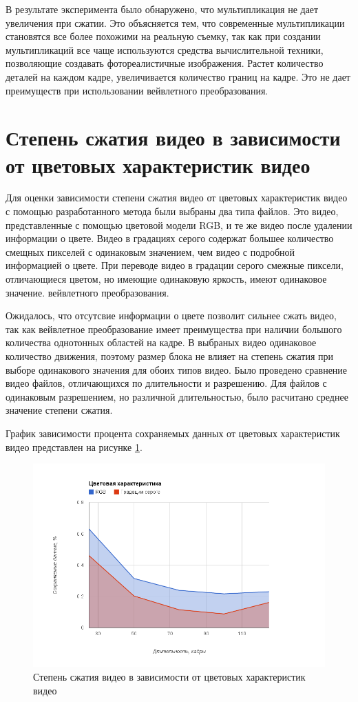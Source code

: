 В результате эксперимента было обнаружено, что мультипликация не дает увеличения при сжатии. Это объясняется тем, что 
современные мультипликации становятся все более похожими на реальную съемку, так как при создании мультипликаций все чаще используются
средства вычислительной техники, позволяющие создавать фотореалистичные изображения. Растет количество деталей на каждом кадре, увеличивается количество границ на кадре.
Это не дает преимуществ при использовании вейвлетного преобразования.

\section{Степень сжатия видео в зависимости от цветовых характеристик видео}

Для оценки зависимости степени сжатия видео от цветовых характеристик видео с помощью разработанного метода были выбраны два типа файлов. 
Это видео, представленные с помощью цветовой модели RGB, и те же видео после удалении информации о цвете.
Видео в градациях серого содержат большее количество смещных пикселей с одинаковым значением, чем видео с подробной информацией о цвете.
При переводе видео в градации серого смежные пиксели, отличающиеся цветом, но имеющие одинаковую яркость, имеют одинаковое значение.
вейвлетного преобразования.

Ожидалось, что отсутсвие информации о цвете позволит сильнее сжать видео, так как вейвлетное преобразование имеет преимущества при наличии большого количества однотонных областей 
на кадре.
В выбраных видео одинаковое количество движения, поэтому размер блока не влияет на степень сжатия при выборе одинакового значения для обоих типов видео.
Было проведено сравнение видео файлов, отличающихся по длительности и разрешению. Для файлов с одинаковым разрешением, но различной длительностью, было расчитано
среднее значение степени сжатия.

График зависимости процента сохраняемых данных от цветовых характеристик видео представлен на рисунке \ref{fig:img3}.

\begin{figure}[ht]
  \centering
  \includegraphics[scale=0.5]{inc/graphics/image3.png}
  \caption{Степень сжатия видео в зависимости от цветовых характеристик видео}
  \label{fig:img3}
\end{figure}

